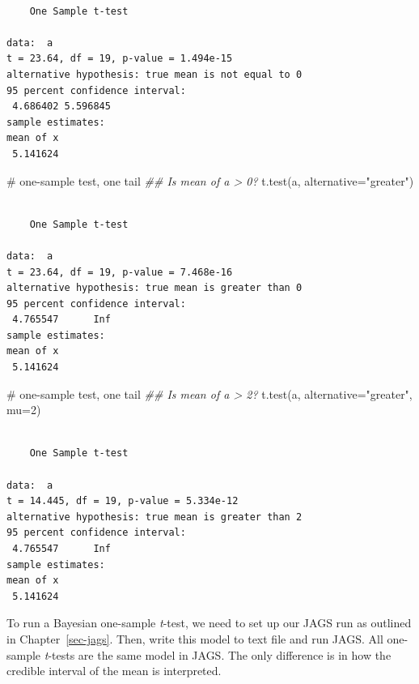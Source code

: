 \documentclass[
  13,
  letterpaper,
]{report}
\newenvironment{Shaded}{\begin{snugshade}}{\end{snugshade}}
\newcommand{\AttributeTok}[1]{\textcolor[rgb]{0.40,0.45,0.13}{#1}}
\newcommand{\CommentTok}[1]{\textcolor[rgb]{0.37,0.37,0.37}{#1}}
\newcommand{\DecValTok}[1]{\textcolor[rgb]{0.68,0.00,0.00}{#1}}
\newcommand{\DocumentationTok}[1]{\textcolor[rgb]{0.37,0.37,0.37}{\textit{#1}}}
\newcommand{\FunctionTok}[1]{\textcolor[rgb]{0.28,0.35,0.67}{#1}}
\newcommand{\NormalTok}[1]{\textcolor[rgb]{0.00,0.23,0.31}{#1}}
\newcommand{\StringTok}[1]{\textcolor[rgb]{0.13,0.47,0.30}{#1}}
\begin{document}
\begin{verbatim}

    One Sample t-test

data:  a
t = 23.64, df = 19, p-value = 1.494e-15
alternative hypothesis: true mean is not equal to 0
95 percent confidence interval:
 4.686402 5.596845
sample estimates:
mean of x 
 5.141624 
\end{verbatim}

\begin{Shaded}
\begin{Highlighting}[]
\CommentTok{\# one{-}sample test, one tail}
\DocumentationTok{\#\# Is mean of a \textgreater{} 0?}
\FunctionTok{t.test}\NormalTok{(a, }\AttributeTok{alternative=}\StringTok{"greater"}\NormalTok{)}
\end{Highlighting}
\end{Shaded}

\begin{verbatim}

    One Sample t-test

data:  a
t = 23.64, df = 19, p-value = 7.468e-16
alternative hypothesis: true mean is greater than 0
95 percent confidence interval:
 4.765547      Inf
sample estimates:
mean of x 
 5.141624 
\end{verbatim}

\begin{Shaded}
\begin{Highlighting}[]
\CommentTok{\# one{-}sample test, one tail}
\DocumentationTok{\#\# Is mean of a \textgreater{} 2?}
\FunctionTok{t.test}\NormalTok{(a, }\AttributeTok{alternative=}\StringTok{"greater"}\NormalTok{, }\AttributeTok{mu=}\DecValTok{2}\NormalTok{)}
\end{Highlighting}
\end{Shaded}

\begin{verbatim}

    One Sample t-test

data:  a
t = 14.445, df = 19, p-value = 5.334e-12
alternative hypothesis: true mean is greater than 2
95 percent confidence interval:
 4.765547      Inf
sample estimates:
mean of x 
 5.141624 
\end{verbatim}

To run a Bayesian one-sample \emph{t}-test, we need to set up our JAGS
run as outlined in Chapter~\ref{sec-jags}. Then, write this model to
text file and run JAGS. All one-sample \emph{t}-tests are the same model
in JAGS. The only difference is in how the credible interval of the mean
is interpreted.
\end{document}

